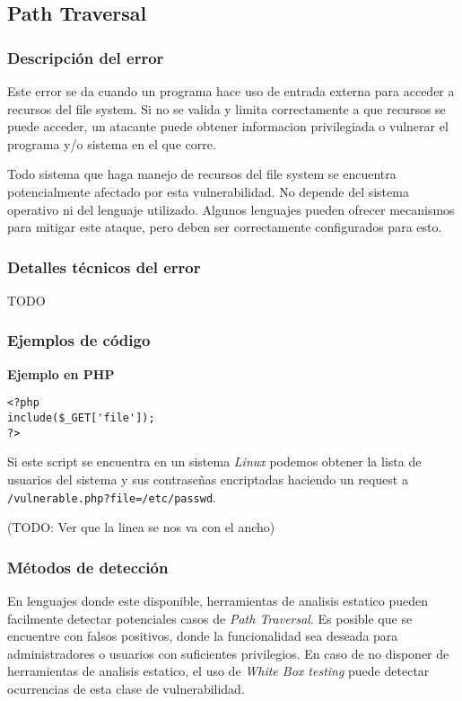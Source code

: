 \subsection{Path Traversal}

\subsubsection{Descripción del error}

Este error se da cuando un programa hace uso de entrada externa para acceder a recursos del file system.
Si no se valida y limita correctamente a que recursos se puede acceder, un atacante puede obtener informacion privilegiada o vulnerar el programa y/o sistema en el que corre.

Todo sistema que haga manejo de recursos del file system se encuentra potencialmente afectado por esta vulnerabilidad.
No depende del sistema operativo ni del lenguaje utilizado.
Algunos lenguajes pueden ofrecer mecanismos para mitigar este ataque, pero deben ser correctamente configurados para esto.

\subsubsection{Detalles técnicos del error}

TODO

\subsubsection{Ejemplos de código}

\noindent \textbf{Ejemplo en PHP}\\

\begin{lstlisting}[frame=single]
<?php
include($_GET['file']);
?>
\end{lstlisting}

Si este script se encuentra en un sistema \textit{Linux} podemos obtener la lista de usuarios del sistema y sus contraseñas encriptadas haciendo un request a \texttt{/vulnerable.php?file=/etc/passwd}.

(TODO: Ver que la linea se nos va con el ancho)

\subsubsection{Métodos de detección}

En lenguajes donde este disponible, herramientas de analisis estatico pueden facilmente detectar potenciales casos de \textit{Path Traversal}. Es posible que se encuentre con falsos positivos, donde la funcionalidad sea deseada para administradores o usuarios con suficientes privilegios.
En caso de no disponer de herramientas de analisis estatico, el uso de \textit{White Box testing} puede detectar ocurrencias de esta clase de vulnerabilidad.


